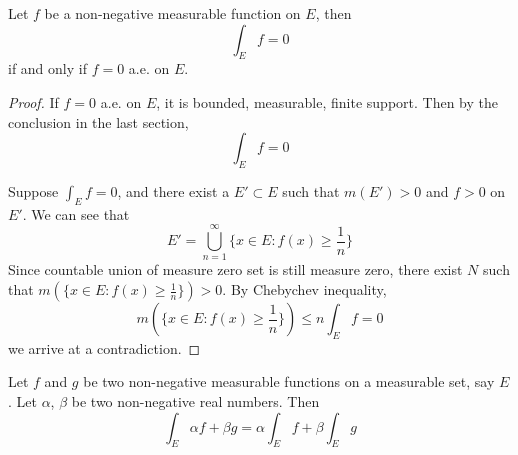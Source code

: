 \documentclass[lang=en, 12pt]{elegantbook}
\begin{document}
            \begin{proposition}\label{Non-negative function and measure zero set}
                Let $f$ be a non-negative measurable function on $E$, then 
                $$\int_E f = 0$$
                if and only if $f= 0$ a.e. on $E$.
            \end{proposition}
            \begin{proof}
                If $f = 0$ a.e. on $E$, it is bounded, measurable, finite support. Then by the conclusion in the last section, 
            $$\int_E f = 0$$\par
                Suppose $\int_E f = 0$, and there exist a $E' \subset E$ such that $m(E') > 0 $ and $f > 0$ on $E'$. We can see that 
            $$E' = \bigcup_{n=1}^{\infty} \{x\in E: f(x) \geq \frac{1}{n} \}$$
            Since countable union of measure zero set is still measure zero, there exist $N$ such that 
            $m(\{x\in E: f(x) \geq \frac{1}{n} \}) > 0 $. By Chebychev inequality, 
            $$m(\{x\in E: f(x) \geq \frac{1}{n} \}) \leq n \int_E f = 0$$
            we arrive at a contradiction.
            \end{proof}
            \begin{theorem}[Linearity]
                Let $f$ and $g$ be two non-negative measurable functions on a measurable set, say $E$. Let $\alpha$, $\beta$ be two non-negative
            real numbers. Then
            $$\int_E \alpha f + \beta g = \alpha\int_E f + \beta \int_E g$$
            \end{theorem}
\end{document}
